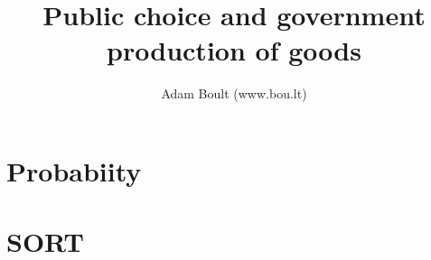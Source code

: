 \documentclass[oneside]{book}
\begin{document}
\author{Adam Boult (www.bou.lt)}
\title{Public choice and government production of goods}
\maketitle

\setcounter{tocdepth}{0}
\tableofcontents



\part{Probabiity}


\part{SORT}

\end{document}
